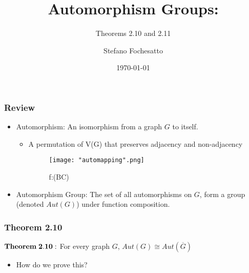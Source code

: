 \documentclass{beamer}
\title{Automorphism Groups:}
\subtitle{Theorems 2.10 and 2.11}
\author{Stefano Fochesatto}
\institute{University of Alaska Fairbanks}
\date{\today}
\begin{document}
 \begin{frame}
\titlepage
\end{frame}

\begin{frame}
\frametitle{Review}
\begin{center}
\begin{itemize}
	\item Automorphism: An isomorphism from a graph $G$ to itself. 
	\begin{itemize}
		\item A permutation of V(G) that preserves adjacency and non-adjacency
			\begin{figure}[H]
			\caption{f:(BC)}
			\centering
			\texttt{[image: "automapping".png]}
			\end{figure}

	\end{itemize}
		\vfill
	\item Automorphism Group: The set of all automorphisms on $G$, form a group (denoted $Aut(G)$) under function composition. 
\end{itemize}
\end{center}
\end{frame}




\begin{frame}
\frametitle{Theorem 2.10}
\begin{center}
$\bold{Theorem \;2.10:}$ For every graph $G$, $Aut(G) \cong Aut(\overline{G})$
\begin{itemize}
	\item How do we prove this?
\end{itemize}
\end{center}
\end{frame}
\end{document}
